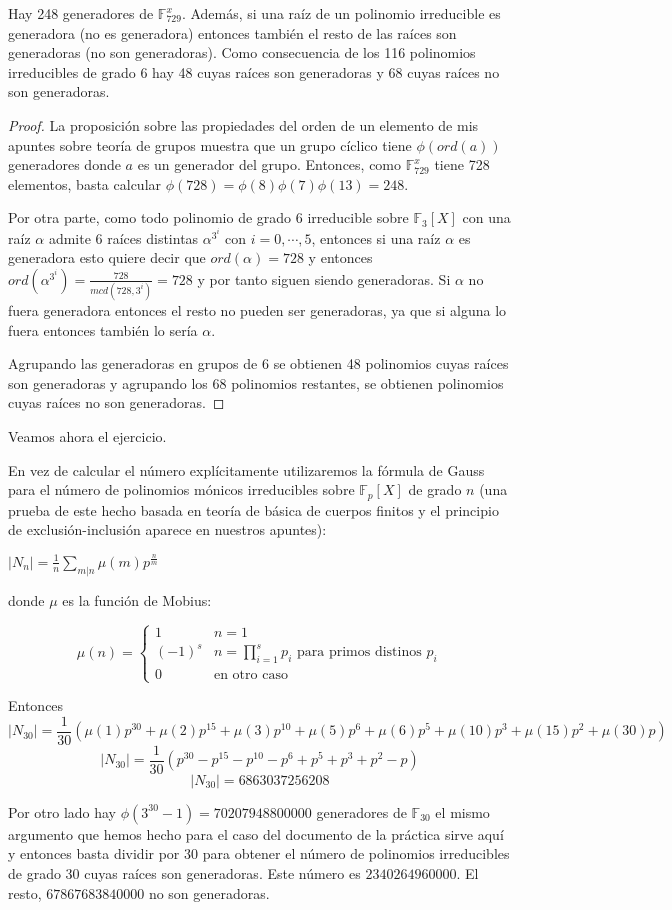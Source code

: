 \begin{proposition}
	Hay 248 generadores de $\mathbb{F}_{729}^x$. Además, si una raíz de un polinomio irreducible es generadora (no es generadora) entonces también el resto de las raíces son generadoras (no son generadoras). Como consecuencia de los 116 polinomios irreducibles de grado 6 hay 48 cuyas raíces son generadoras y 68 cuyas raíces no son generadoras. 
\end{proposition}
\begin{proof}
	La proposición sobre las propiedades del orden de un elemento de mis apuntes sobre teoría de grupos muestra que un grupo cíclico tiene $\phi(ord(a))$ generadores donde $a$ es un generador del grupo. Entonces, como $\mathbb{F}_{729}^x$ tiene 728 elementos, basta calcular $\phi(728) = \phi(8) \phi(7) \phi(13) = 248$. 
	
	Por  otra parte, como todo polinomio de grado $6$ irreducible sobre $\mathbb{F}_3[X]$ con una raíz $\alpha$ admite $6$ raíces distintas $\alpha^{3^i}$ con $i = 0,\cdots,5$, entonces si una raíz $\alpha$ es generadora esto quiere decir que $ord(\alpha) = 728$ y entonces $ord(\alpha^{3^i}) = \frac{728}{mcd(728,3^i)} = 728$ y por tanto siguen siendo generadoras. Si $\alpha$ no fuera generadora entonces el resto no pueden ser generadoras, ya que si alguna lo fuera entonces también lo sería $\alpha$. 
	
	Agrupando las generadoras en grupos de $6$ se obtienen 48 polinomios cuyas raíces son generadoras y agrupando los 68 polinomios restantes, se obtienen polinomios cuyas raíces no son generadoras.
\end{proof}

Veamos ahora el ejercicio. 

En vez de calcular el número explícitamente utilizaremos la fórmula de Gauss para el número de polinomios mónicos irreducibles sobre $\mathbb{F}_p[X]$ de grado $n$ (una prueba de este hecho basada en teoría de básica de cuerpos finitos y el principio de exclusión-inclusión aparece en nuestros apuntes):

$|N_n| = \frac{1}{n} \sum_{m|n} \mu(m) p^{\frac{n}{m}}$

donde $\mu$ es la función de Mobius:

	\[
	\mu(n) = 
	\begin{cases} 
	1 & n = 1 \\
	(-1)^s & n = \prod_{i = 1}^s p_i \text{ para primos distinos } p_i \\
	0   & \text{en otro caso}
	\end{cases}
	\]

Entonces $$|N_{30}| = \frac{1}{30}(\mu(1)p^{30} + \mu(2)p^{15}+\mu(3)p^{10}+\mu(5)p^6+\mu(6)p^5+\mu(10)p^3+\mu(15)p^2+\mu(30)p)$$ $$|N_{30}| = \frac{1}{30}(p^{30}-p^{15}-p^{10}-p^6+p^5+p^3+p^2-p)$$
$$|N_{30}| = 6863037256208$$

Por otro lado hay $\phi(3^{30} - 1) = 70207948800000$ generadores de $\mathbb{F}_{30}$ el mismo argumento que hemos hecho para el caso del documento de la práctica sirve aquí y entonces basta dividir por $30$ para obtener el número de polinomios irreducibles de grado 30 cuyas raíces son generadoras. Este número es $2340264960000$. El resto, $67867683840000$ no son generadoras. 